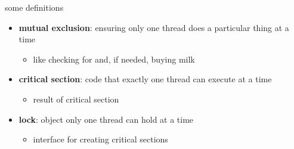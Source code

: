 \begin{frame}{some definitions}
\begin{itemize}
\item \textbf{mutual exclusion}: ensuring only one thread does a particular thing at a time
    \begin{itemize}
        \item like checking for and, if needed, buying milk
    \end{itemize}
\item<2-> \textbf{critical section}: code that exactly one thread can execute at a time
    \begin{itemize}
        \item result of critical section
    \end{itemize}
\item<3-> \textbf{lock}: object only one thread can hold at a time
    \begin{itemize}
        \item interface for creating critical sections
    \end{itemize}
\end{itemize}
\end{frame}
